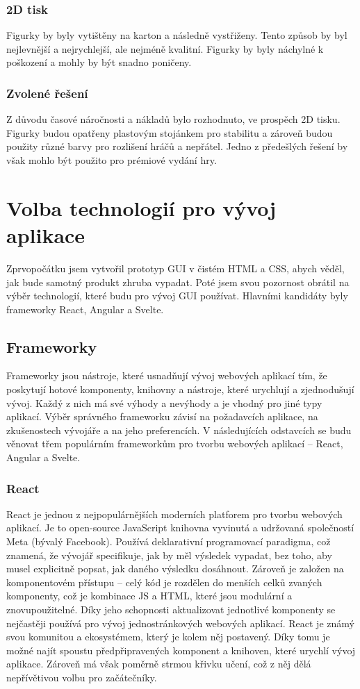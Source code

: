 \subsubsection*{2D tisk}
Figurky by byly vytištěny na karton a následně vystřiženy. Tento způsob by byl nejlevnější a nejrychlejší, ale nejméně kvalitní. Figurky by byly náchylné k poškození a mohly by být snadno poničeny.

\subsubsection*{Zvolené řešení}
Z důvodu časové náročnosti a nákladů bylo rozhodnuto, ve prospěch 2D tisku. Figurky budou opatřeny plastovým stojánkem pro stabilitu a zároveň budou použity různé barvy pro rozlišení hráčů a nepřátel. Jedno z předešlých řešení by však mohlo být použito pro prémiové vydání hry.

\section{Volba technologií pro vývoj aplikace}
Zprvopočátku jsem vytvořil prototyp GUI v čistém HTML a CSS, abych věděl, jak bude samotný produkt zhruba vypadat. Poté jsem svou pozornost obrátil na výběr technologií, které budu pro vývoj GUI používat. Hlavními kandidáty byly frameworky React, Angular a Svelte.

\subsection{Frameworky}
Frameworky jsou nástroje, které usnadňují vývoj webových aplikací tím, že poskytují hotové komponenty, knihovny a nástroje, které urychlují a zjednodušují vývoj. Každý z nich má své výhody a nevýhody a je vhodný pro jiné typy aplikací. Výběr správného frameworku závisí na požadavcích aplikace, na zkušenostech vývojáře a na jeho preferencích. V následujících odstavcích se budu věnovat třem populárním frameworkům pro tvorbu webových aplikací -- React, Angular a Svelte.

\subsubsection*{React}
React je jednou z nejpopulárnějších moderních platforem pro tvorbu webových aplikací. Je to open-source JavaScript knihovna vyvinutá a udržovaná společností Meta (bývalý Facebook). Používá deklarativní programovací paradigma, což znamená, že vývojář specifikuje, jak by měl výsledek vypadat, bez toho, aby musel explicitně popsat, jak daného výsledku dosáhnout. Zároveň je založen na komponentovém přístupu -- celý kód je rozdělen do menších celků zvaných komponenty, což je kombinace JS a HTML, které jsou modulární a znovupoužitelné. Díky jeho schopnosti aktualizovat jednotlivé komponenty se nejčastěji používá pro vývoj jednostránkových webových aplikací. React je známý svou komunitou a ekosystémem, který je kolem něj postavený. Díky tomu je možné najít spoustu předpřipravených komponent a knihoven, které urychlí vývoj aplikace. Zároveň má však poměrně strmou křivku učení, což z něj dělá nepřívětivou volbu pro začátečníky.

